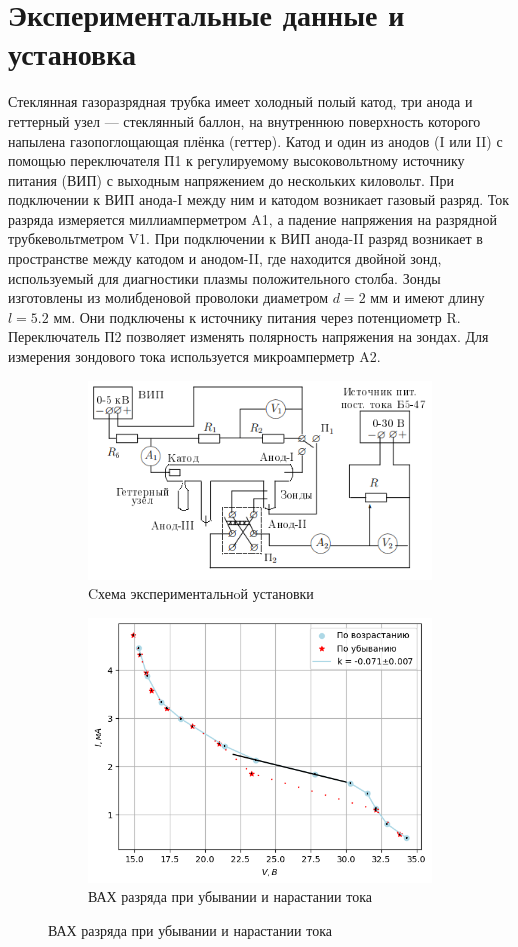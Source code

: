 \section*{Экспериментальные данные и установка}
\indent Стеклянная газоразрядная трубка имеет холодный полый катод, три анода и геттерный узел — стеклянный баллон, на внутреннюю поверхность которого напылена газопоглощающая плёнка (геттер).
\noindent Катод и один из анодов (I или II) с помощью переключателя П1 к регулируемому высоковольтному источнику питания (ВИП) с выходным напряжением до нескольких киловольт. При подключении к ВИП анода-I между ним и катодом возникает газовый разряд.
Ток разряда измеряется миллиамперметром A1, а падение напряжения на разрядной трубкевольтметром V1. При подключении к ВИП анода-II разряд возникает в пространстве
между катодом и анодом-II, где находится двойной зонд, используемый для диагностики плазмы положительного столба.
Зонды изготовлены
из молибденовой проволоки диаметром $d = 2$  мм и имеют длину $l = 5.2$ мм. Они подключены к источнику питания через потенциометр R. Переключатель П2 позволяет изменять полярность напряжения на зондах.
Для измерения зондового тока используется микроамперметр A2. 
\begin{figure}[h!]
    \begin{subfigure}{0.5\linewidth}
        \centering
        \includegraphics[width=9.5cm]{setup.png}
        \caption*{Cхема экспериментальнoй установки}
    \end{subfigure}
    \hfill
    \begin{subfigure}{0.5\linewidth}
        \centering
        \includegraphics[width=9.5cm]{images/plot1.png}
        \caption*{ВАХ разряда при убывании и нарастании тока}
    \end{subfigure}
\end{figure}


